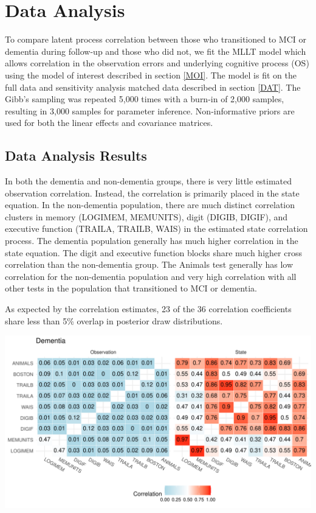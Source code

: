 \documentclass[
]{article}
\author{}
\date{\vspace{-2.5em}}
\begin{document}
\hypertarget{data-analysis}{%
\section{Data Analysis}\label{data-analysis}}

To compare latent process correlation between those who transitioned to MCI or dementia during follow-up and those who did not, we fit the MLLT model which allows correlation in the observation errors and underlying cognitive process (OS) using the model of interest described in section \ref{MOI}. The model is fit on the full data and sensitivity analysis matched data described in section \ref{DAT}. The Gibb's sampling was repeated 5,000 times with a burn-in of 2,000 samples, resulting in 3,000 samples for parameter inference. Non-informative priors are used for both the linear effects and covariance matrices.

\hypertarget{data-analysis-results}{%
\subsection{Data Analysis Results}\label{data-analysis-results}}

In both the dementia and non-dementia groups, there is very little estimated observation correlation. Instead, the correlation is primarily placed in the state equation. In the non-dementia population, there are much distinct correlation clusters in memory (LOGIMEM, MEMUNITS), digit (DIGIB, DIGIF), and executive function (TRAILA, TRAILB, WAIS) in the estimated state correlation process. The dementia population generally has much higher correlation in the state equation. The digit and executive function blocks share much higher cross correlation than the non-dementia group. The Animals test generally has low correlation for the non-dementia population and very high correlation with all other tests in the population that transitioned to MCI or dementia.

As expected by the correlation estimates, 23 of the 36 correlation coefficients share less than 5\% overlap in posterior draw distributions.

\includegraphics{DataAnalysis_files/figure-latex/unnamed-chunk-3-1.pdf}
\end{document}
